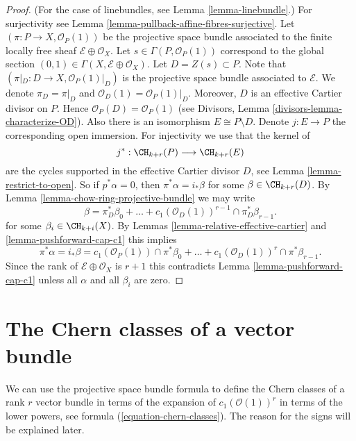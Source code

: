\begin{proof}
(For the case of linebundles, see Lemma \ref{lemma-linebundle}.)
For surjectivity see Lemma \ref{lemma-pullback-affine-fibres-surjective}.
Let $(\pi  : P \to X, \mathcal{O}_P(1))$
be the projective space bundle associated
to the finite locally free sheaf $\mathcal{E} \oplus \mathcal{O}_X$.
Let $s \in \Gamma(P, \mathcal{O}_P(1))$ correspond to the global
section $(0, 1) \in \Gamma(X, \mathcal{E} \oplus \mathcal{O}_X)$.
Let $D = Z(s) \subset P$. Note that
$(\pi|_D : D \to X , \mathcal{O}_P(1)|_D)$
is the projective space bundle associated
to $\mathcal{E}$. We denote $\pi_D = \pi|_D$ and
$\mathcal{O}_D(1) = \mathcal{O}_P(1)|_D$.
Moreover, $D$ is an effective
Cartier divisor on $P$. Hence $\mathcal{O}_P(D) = \mathcal{O}_P(1)$
(see Divisors, Lemma \ref{divisors-lemma-characterize-OD}).
Also there is an isomorphism
$E \cong P \setminus D$. Denote $j : E \to P$ the
corresponding open immersion.
For injectivity we use that the kernel of
$$
j^* :
\CH_{k + r}(P)
\longrightarrow
\CH_{k + r}(E)
$$
are the cycles supported in the effective Cartier divisor $D$,
see Lemma \ref{lemma-restrict-to-open}. So if $p^*\alpha = 0$, then
$\pi^*\alpha = i_*\beta$ for some $\beta \in \CH_{k + r}(D)$.
By Lemma \ref{lemma-chow-ring-projective-bundle} we may write
$$
\beta = \pi_D^*\beta_0 +
\ldots + c_1(\mathcal{O}_D(1))^{r - 1} \cap \pi_D^* \beta_{r - 1}.
$$
for some $\beta_i \in \CH_{k + i}(X)$.
By Lemmas \ref{lemma-relative-effective-cartier}
and \ref{lemma-pushforward-cap-c1}
this implies
$$
\pi^*\alpha = i_*\beta =
c_1(\mathcal{O}_P(1)) \cap \pi^*\beta_0 +
\ldots +
c_1(\mathcal{O}_D(1))^r \cap \pi^*\beta_{r - 1}.
$$
Since the rank of $\mathcal{E} \oplus \mathcal{O}_X$ is $r + 1$
this contradicts Lemma \ref{lemma-pushforward-cap-c1} unless all
$\alpha$ and all $\beta_i$ are zero.
\end{proof}








\section{The Chern classes of a vector bundle}
\label{section-chern-classes-vector-bundles}

\noindent
We can use the projective space bundle formula to define the
Chern classes of a rank $r$ vector bundle in terms of the expansion
of $c_1(\mathcal{O}(1))^r$ in terms of the lower powers, see
formula (\ref{equation-chern-classes}).
The reason for the signs will be explained later.


